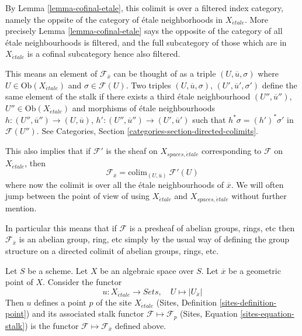 \noindent
By
Lemma \ref{lemma-cofinal-etale},
this colimit is over a filtered
index category, namely the oppsite of the category of \'etale neighborhoods
in $X_{\acute{e}tale}$. More precisely
Lemma \ref{lemma-cofinal-etale}
says the opposite of the category of all \'etale neighbourhoods is filtered,
and the full subcategory of those which are in $X_{\acute{e}tale}$ is a cofinal
subcategory hence also filtered.

\medskip\noindent
This means an element of $\mathcal{F}_{\overline{x}}$ can be
thought of as a triple $(U, \overline{u}, \sigma)$ where
$U \in \text{Ob}(X_{\acute{e}tale})$ and $\sigma \in \mathcal{F}(U)$.
Two triples $(U, \overline{u}, \sigma)$, $(U', \overline{u}', \sigma')$
define the same element of the stalk if there exists a third
\'etale neighbourhood
$(U'', \overline{u}'')$, $U'' \in \text{Ob}(X_{\acute{e}tale})$
and morphisms of \'etale neighbourhoods
$h : (U'', \overline{u}'') \to (U, \overline{u})$,
$h' : (U'', \overline{u}'') \to (U', \overline{u}')$ such that
$h^*\sigma = (h')^*\sigma'$ in $\mathcal{F}(U'')$. See
Categories, Section \ref{categories-section-directed-colimits}.

\medskip\noindent
This also implies that if $\mathcal{F}'$ is the sheaf on
$X_{spaces, \acute{e}tale}$ corresponding to $\mathcal{F}$ on
$X_{\acute{e}tale}$, then
\begin{equation}
\label{equation-stalk-spaces-etale}
\mathcal{F}_{\overline{x}} = \text{colim}_{(U, \overline{u})}\ \mathcal{F}'(U)
\end{equation}
where now the colimit is over all the \'etale neighbourhoods of $\overline{x}$.
We will often jump between the point of view of using $X_{\acute{e}tale}$
and $X_{spaces, \acute{e}tale}$ without further mention.

\medskip\noindent
In particular this means that if $\mathcal{F}$ is a presheaf of
abelian groups, rings, etc then $\mathcal{F}_{\overline{x}}$ is
an abelian group, ring, etc simply by the usual way of defining the
group structure on a directed colimit of abelian groups, rings, etc.

\begin{lemma}
\label{lemma-stalk-gives-point}
Let $S$ be a scheme.
Let $X$ be an algebraic space over $S$.
Let $\overline{x}$ be a geometric point of $X$.
Consider the functor
$$
u : X_{\acute{e}tale} \longrightarrow \textit{Sets},\quad
U \longmapsto |U_{\overline{x}}|
$$
Then $u$ defines a point $p$ of the site $X_{\acute{e}tale}$
(Sites, Definition \ref{sites-definition-point})
and its associated stalk functor $\mathcal{F} \mapsto \mathcal{F}_p$
(Sites, Equation \ref{sites-equation-stalk})
is the functor $\mathcal{F} \mapsto \mathcal{F}_{\overline{x}}$
defined above.
\end{lemma}

